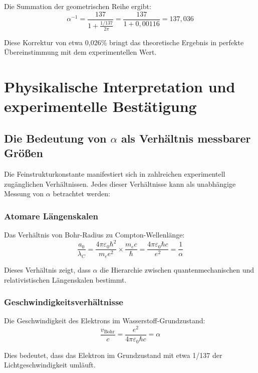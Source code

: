 \documentclass[12pt,a4paper]{article}
\theoremstyle{definition}
\begin{document}
	Die Summation der geometrischen Reihe ergibt:
	\begin{equation}
		\alpha^{-1} = \frac{137}{1 + \frac{1/137}{2\pi}} = \frac{137}{1 + 0{,}00116} = 137{,}036
	\end{equation}
	
	Diese Korrektur von etwa 0{,}026\% bringt das theoretische Ergebnis in perfekte Übereinstimmung mit dem experimentellen Wert.
	
	\section{Physikalische Interpretation und experimentelle Bestätigung}
	
	\subsection{Die Bedeutung von $\alpha$ als Verhältnis messbarer Größen}
	
	Die Feinstrukturkonstante manifestiert sich in zahlreichen experimentell zugänglichen Verhältnissen. Jedes dieser Verhältnisse kann als unabhängige Messung von $\alpha$ betrachtet werden:
	
	\subsubsection{Atomare Längenskalen}
	
	Das Verhältnis von Bohr-Radius zu Compton-Wellenlänge:
	\begin{equation}
		\frac{a_0}{\lambda_C} = \frac{4\pi\varepsilon_0\hbar^2}{m_e e^2} \times \frac{m_e c}{\hbar} = \frac{4\pi\varepsilon_0\hbar c}{e^2} = \frac{1}{\alpha}
	\end{equation}
	
	Dieses Verhältnis zeigt, dass $\alpha$ die Hierarchie zwischen quantenmechanischen und relativistischen Längenskalen bestimmt.
	
	\subsubsection{Geschwindigkeitsverhältnisse}
	
	Die Geschwindigkeit des Elektrons im Wasserstoff-Grundzustand:
	\begin{equation}
		\frac{v_{\text{Bohr}}}{c} = \frac{e^2}{4\pi\varepsilon_0\hbar c} = \alpha
	\end{equation}
	
	Dies bedeutet, dass das Elektron im Grundzustand mit etwa 1/137 der Lichtgeschwindigkeit umläuft.
	
\end{document}
